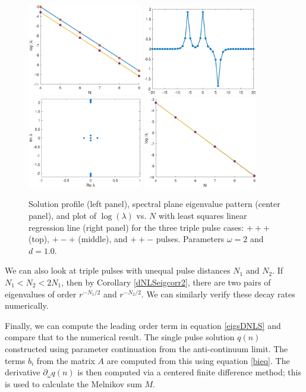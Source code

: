 \documentclass[12pt]{article}
\begin{document}
\begin{figure}[H]
\includegraphics[width=5cm]{dnlsPMPdecay.eps}
\includegraphics[width=5cm]{dnlsPPM.eps}
\includegraphics[width=5cm]{dnlsPPMeig.eps}
\includegraphics[width=5cm]{dnlsPPMdecay.eps}
\caption{Solution profile (left panel), spectral plane eigenvalue pattern (center panel), and plot of $\log(\lambda)$ vs. $N$ with least squares linear regression line (right panel) for the three triple pulse cases: $+++$ (top), $+-+$ (middle), and $++-$ pulses. Parameters $\omega = 2$ and $d = 1.0$.}
\label{fig:eigendecay2}
\end{figure}

We can also look at triple pulses with unequal pulse distances $N_1$ and $N_2$. If $N_1 < N_2 < 2 N_1$, then by Corollary \ref{dNLSeigcorr2}, there are two pairs of eigenvalues of order $r^{-N_1/2}$ and $r^{-N_2/2}$. We can similarly verify these decay rates numerically.

Finally, we can compute the leading order term in equation \eqref{eigsDNLS} and compare that to the numerical result. The single pulse solution $q(n)$ constructed using parameter continuation from the anti-continuum limit. The terms $b_i$ from the matrix $A$ are computed from this using equation \eqref{bieq}. The derivative $\partial_\omega q(n)$ is then computed via a centered finite difference method; this is used to calculate the Melnikov sum $M$. 
\end{document}
